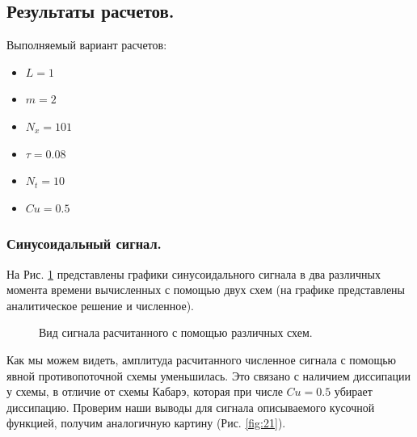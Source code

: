\subsection{Результаты расчетов.}
Выполняемый вариант расчетов:
\begin{itemize}
    \item $L=1$    	
    \item $m=2$    	
    \item $N_x=101 $
    \item $\tau=0.08$
    \item $N_t=10$
    \item $Cu=0.5$
\end{itemize}
\subsubsection{Синусоидальный сигнал.}
На Рис. \ref{fig:11} представлены графики синусоидального сигнала в два различных момента времени вычисленных с помощью двух схем (на графике представлены аналитическое решение и численное).

\begin{figure}[H]
    \centering
    \hfill
    \hfill
    \caption{Вид сигнала расчитанного с помощью различных схем.}
    \label{fig:11}
\end{figure}

Как мы можем видеть, амплитуда расчитанного численное сигнала с помощью явной противопоточной схемы уменьшилась. Это связано с наличием диссипации у схемы, в отличие от схемы Кабарэ, которая при числе $Cu=0.5$ убирает диссипацию. 
Проверим наши выводы для сигнала описываемого кусочной функцией, получим аналогичную картину (Рис. \ref{fig:21}).


